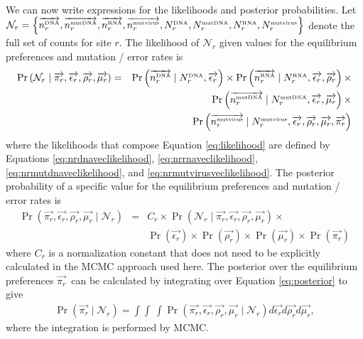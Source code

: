 \documentclass[12pt,draft]{article}
\newcommand{\Nrdna}{\mbox{$N_r^{\rm \scriptscriptstyle DNA}$}}
\newcommand{\Nrmutdna}{\mbox{$N_r^{\rm \scriptscriptstyle mut DNA}$}}
\newcommand{\Nrrna}{\mbox{$N_r^{\rm \scriptscriptstyle RNA}$}}
\newcommand{\Nrmutvirus}{\mbox{$N_r^{\rm \scriptscriptstyle mut virus}$}}
\newcommand{\nrdnavec}{\mbox{$\overrightarrow{n_{r}^{\rm \scriptscriptstyle DNA}}$}}
\newcommand{\nrmutdnavec}{\mbox{$\overrightarrow{n_{r}^{\rm \scriptscriptstyle mut DNA}}$}}
\newcommand{\nrrnavec}{\mbox{$\overrightarrow{n_{r}^{\rm \scriptscriptstyle  RNA}}$}}
\newcommand{\nrmutvirusvec}{\mbox{$\overrightarrow{n_{r}^{\rm \scriptscriptstyle mut virus}}$}}
\newcommand{\ervec}{\mbox{$\overrightarrow{\epsilon_{r}}$}}
\newcommand{\rrvec}{\mbox{$\overrightarrow{\rho_{r}}$}}
\newcommand{\mrvec}{\mbox{$\overrightarrow{\mu_{r}}$}}
\newcommand{\pirvec}{\mbox{$\overrightarrow{\pi_r}$}}
\begin{document}
We can now write expressions for the likelihoods and posterior probabilities. Let $\mathcal{N}_r = \left\{\nrdnavec, \nrmutdnavec, \nrrnavec, \nrmutvirusvec, \Nrdna, \Nrmutdna, \Nrrna, \Nrmutvirus\right\}$ denote the full set of counts for site $r$. The likelihood of $\mathcal{N}_r$ given values for the equilibrium preferences and mutation / error rates is 
\begin{eqnarray}
\label{eq:likelihood}
 \Pr\left(\mathcal{N}_r \mid \pirvec, \ervec, \rrvec, \mrvec \right) &=&  
\Pr\left(\nrdnavec \mid \Nrdna, \ervec\right) \times
\Pr\left(\nrrnavec \mid \Nrrna, \ervec, \rrvec\right)  \times \nonumber \\
&& \Pr\left(\nrmutdnavec \mid \Nrmutdna, \ervec, \mrvec\right) 
\times \nonumber \\
&& \Pr\left(\nrmutvirusvec \mid \Nrmutvirus, \ervec, \rrvec, \mrvec, \pirvec\right) 
\end{eqnarray}
where the likelihoods that compose Equation \ref{eq:likelihood} are defined by Equations \ref{eq:nrdnaveclikelihood}, \ref{eq:nrrnaveclikelihood}, \ref{eq:nrmutdnaveclikelihood}, and \ref{eq:nrmutvirusveclikelihood}. The posterior probability of a specific value for the equilibrium preferences and mutation / error rates is
\begin{eqnarray}
\label{eq:posterior}
 \Pr\left(\pirvec, \ervec, \rrvec, \mrvec \mid \mathcal{N}_{r} \right) &=& 
C_r \times 
 \Pr\left(\mathcal{N}_r \mid \pirvec, \ervec, \rrvec, \mrvec \right) \times \\
&& \Pr\left(\ervec\right) \times \Pr\left(\rrvec\right) \times \Pr\left(\mrvec\right) \times \Pr\left(\pirvec\right)
\end{eqnarray}
where $C_r$ is a normalization constant that does not need to be explicitly calculated in the MCMC approach used here. The posterior over the equilibrium preferences \pirvec\ can be calculated by integrating over Equation \ref{eq:posterior} to give
\begin{eqnarray}
\label{eq:pirposterior}
\Pr\left(\pirvec \mid \mathcal{N}_r \right) = \int \int\ \int \Pr\left(\pirvec, \ervec, \rrvec, \mrvec \mid \mathcal{N}_{r} \right) d\ervec d\rrvec d\mrvec,
\end{eqnarray}
where the integration is performed by MCMC. 
\end{document}
